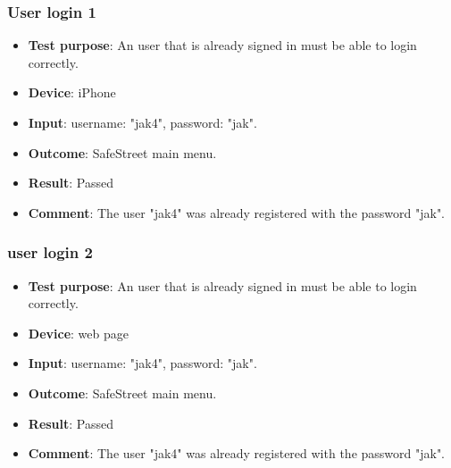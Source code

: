 \documentclass[../ATD.tex]{subfiles}
\begin{document}
    \subsubsection{User login 1}\label{subsubsec:user-login-1}
    \begin{itemize}
        \item \textbf{Test purpose}: An user that is already signed in must be able to login correctly.
        \item \textbf{Device}: iPhone
        \item \textbf{Input}: username: "jak4", password: "jak".
        \item \textbf{Outcome}: SafeStreet main menu.
        \item \textbf{Result}: Passed
        \item \textbf{Comment}: The user "jak4" was already registered with the password "jak".
    \end{itemize}

    \subsubsection{user login 2}\label{subsubsec:user-login-2}
    \begin{itemize}
        \item \textbf{Test purpose}: An user that is already signed in must be able to login correctly.
        \item \textbf{Device}: web page
        \item \textbf{Input}: username: "jak4", password: "jak".
        \item \textbf{Outcome}: SafeStreet main menu.
        \item \textbf{Result}: Passed
        \item \textbf{Comment}: The user "jak4" was already registered with the password "jak".
    \end{itemize}
\end{document}
